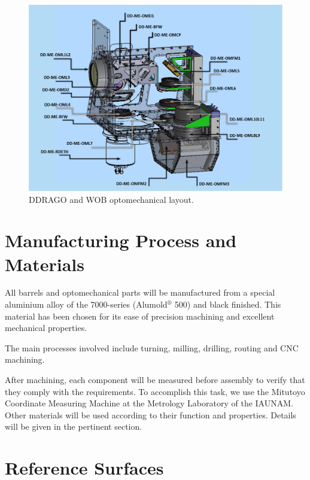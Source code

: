 \documentclass{report}
\begin{document}
\begin{figure}
\begin{center}
\includegraphics[width=\linewidth]{figures/OPTOMECH_LAYOUT_w_labels.png}
\end{center}
\caption{DDRAGO and WOB optomechanical layout.}
\label{figure:rosalia-DD_and_WOB}
\end{figure}

\section{Manufacturing Process and Materials}

All barrels and optomechanical parts will be manufactured from a special aluminium alloy of the 7000-series (Alumold${}^\circledR $ 500) and black finished. This material has been chosen for its ease of precision machining and excellent mechanical properties.

The main processes involved include turning, milling, drilling, routing and CNC machining. 

After machining, each component will be measured before assembly to verify that they comply with the requirements. To accomplish this task, we use the Mitutoyo Coordinate Measuring Machine at the Metrology Laboratory of the IAUNAM.
Other materials will be used according to their function and properties. Details will be given in the pertinent section.

\section{Reference Surfaces}
\end{document}
